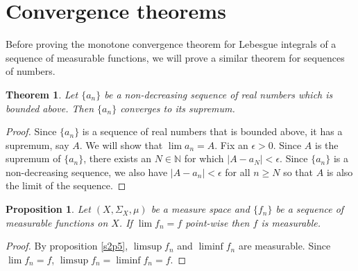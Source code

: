 \documentclass{article}
\newcommand{\son}{\mathbb{N}}
\theoremstyle{plain}
\newtheorem{thm}{Theorem}
\numberwithin{thm}{section}
\theoremstyle{plain}
\newtheorem{prop}{Proposition}
\numberwithin{prop}{section}
\theoremstyle{definition}
\numberwithin{defn}{section}
\theoremstyle{remark}
\theoremstyle{plain}
\numberwithin{cor}{section}
\numberwithin{equation}{section}
\begin{document}
\section{Convergence theorems}\label{c4}
Before proving the monotone convergence theorem for Lebesgue integrals of a
sequence of measurable functions, we will prove a similar theorem for sequences
of numbers.
\begin{thm}\label{c4t1}
Let $\{a_n\}$ be a non-decreasing sequence of real numbers which is bounded 
above. Then $\{a_n\}$ converges to its supremum.
\end{thm}
\begin{proof}
Since $\{a_n\}$ is a sequence of real numbers that is bounded above, it has a
supremum, say $A$. We will show that $\lim a_n = A$. Fix an $\epsilon > 0$.
Since $A$ is the supremum of $\{a_n\}$, there exists an $N \in \son$ for which
$|A - a_N| < \epsilon$. Since $\{a_n\}$ is a non-decreasing sequence, we also
have $|A - a_n| < \epsilon$ for all $n \ge N$ so that $A$ is also the limit of
the sequence.
\end{proof}

\begin{prop}\label{c4p1}
Let $(X, \Sigma_X, \mu)$ be a measure space and $\{f_n\}$ be a sequence of
measurable functions on $X$. If $\lim f_n = f$ point-wise then $f$ is
measurable.
\end{prop}
\begin{proof}
By proposition \ref{s2p5}, $\limsup f_n$ and $\liminf f_n$ are measurable.
Since $\lim f_n = f$, $\limsup f_n = \liminf f_n = f$.
\end{proof}
\end{document}
